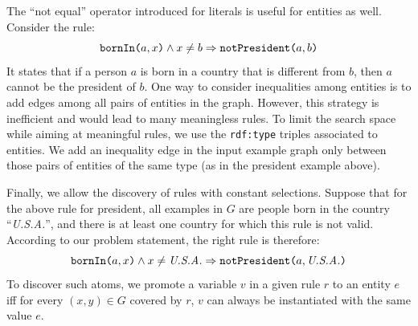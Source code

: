 \noindent {}
The ``not equal'' operator introduced for literals is useful for entities as well. 
Consider the rule:
$$ \texttt{bornIn(}a,x\texttt{)} \wedge x \neq b \Rightarrow \texttt{notPresident(}a,b\texttt{)} $$
It states that if a person $a$ is born in a country that is different from $b$, then $a$ cannot be the president of $b$.
One way to consider inequalities among entities is to add edges among all pairs of entities in the graph. However, this strategy is inefficient and would lead to many meaningless rules. To limit the search space while aiming at meaningful rules, we use the \texttt{rdf:type} triples associated to entities. We add an inequality edge in the input example graph only between those pairs of entities of the same type (as in the president example above). %

\noindent {}
Finally, we allow the discovery of rules with constant selections. %
Suppose that for the above rule for president, all examples in $G$ are people born in the country ``\textit{U.S.A.}'', and there is at least one country for which this rule is not valid. According to our problem statement, the right rule is therefore:
%
$$ \texttt{bornIn(}a,x\texttt{)} \wedge x \neq \emph{U.S.A.} \Rightarrow \texttt{notPresident(}a,\emph{U.S.A.}\texttt{)} $$
%
To discover such atoms, %
we promote a variable $v$ in a given rule $r$ to an entity $e$ iff for every $(x,y) \in G$ covered by $r$, $v$ can always be instantiated with the same value $e$. 

\vspace{-1ex}

